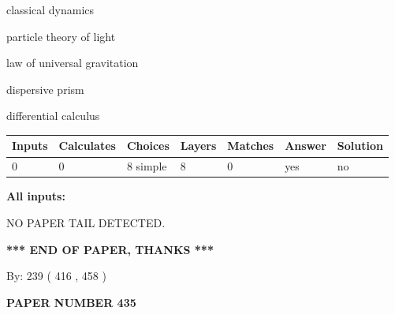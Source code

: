 \documentclass[12pt]{article}
\begin{document}
 
\noindent{}
 
 
classical dynamics
 
 
particle theory of light
 
 
law of universal gravitation
 
 
dispersive prism
 
 
differential calculus
 
 
\noindent{}
 
 
   
   
   
   
\noindent\begin{tabular}{|l|l|l|l|l|l|l|}
 \hline
Inputs & Calculates & Choices & Layers & Matches & Answer & Solution \\ \hline
 0  & 
 0  & 
 8
  simple  
  & 
 8  & 
 0  & 
  yes & 
  no 
  \\ \hline
 \end{tabular}
   
   
   
   
\noindent{}
   
   
   
   
\noindent\vspace{0.1in}\hspace{-0.08in} {\textbf{\Large{All inputs: }}}
   
   
   
   
\vspace{2.0in} NO PAPER TAIL DETECTED.
   
   
   
   
\vspace{1.0in} 
{\textbf{\large{ *** END OF PAPER, THANKS *** }}} 
   
   
\hspace{1.0in} By: 
 239 ( 416 ,  458 )
   
   
   
   
\newpage 
\setcounter{page}{ 
   435001 } 
   
   
   
   
 {\textbf{ \Large{ PAPER NUMBER  435  }}}
   
\end{document}
